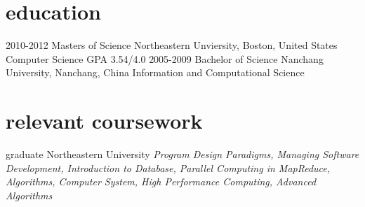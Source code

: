 \documentclass[]{ly-cv} %
\begin{document}
\section{education}
\begin{entrylist}
\entry
{2010-2012}
{Masters of Science} 
{Northeastern Unviersity, Boston, United States}
{Computer Science \hspace{4mm} \footnotesize{GPA 3.54/4.0}}
\entry
{2005-2009}
{Bachelor of Science}
{Nanchang University, Nanchang, China} 
{Information and Computational Science}
\end{entrylist}
\section{relevant coursework}

\begin{entrylist}
\entry
{graduate}
{}
{Northeastern University}
{\emph{Program Design Paradigms, Managing Software Development, Introduction to Database, Parallel Computing in MapReduce, Algorithms,
Computer System, High Performance Computing, Advanced Algorithms}}
\end{entrylist}
\end{document}
